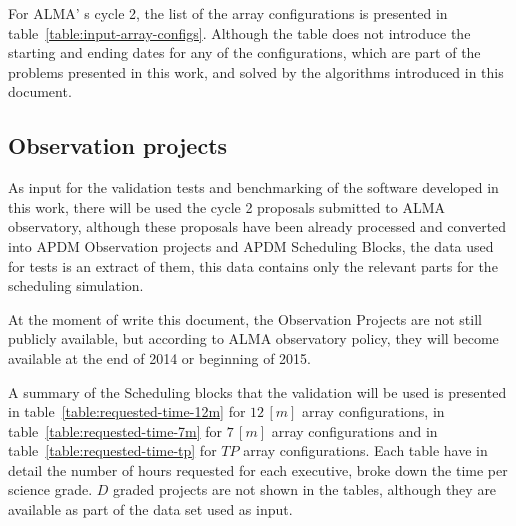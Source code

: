 For ALMA' s cycle 2, the list of the array configurations is presented in table~\ref{table:input-array-configs}. Although the table does not introduce the starting and ending dates for any of the configurations, which are part of the problems presented in this work, and solved by the algorithms introduced in this document.


\subsection{Observation projects}
As input for the validation tests and benchmarking of the software developed in this work, there will be used the cycle 2 proposals submitted to ALMA observatory, although these proposals have been already processed and converted into APDM Observation projects and APDM Scheduling Blocks, the data used for tests is an extract of them, this data contains only the relevant parts for the scheduling simulation.

At the moment of write this document, the Observation Projects are not still publicly available, but according to ALMA observatory policy, they will become available at the end of 2014 or beginning of 2015. 

A summary of the Scheduling blocks that the validation will be used is presented in table~\ref{table:requested-time-12m} for $12\,[m]$ array configurations, in table~\ref{table:requested-time-7m} for $7\,[m]$ array configurations and in table~\ref{table:requested-time-tp} for $TP$  array configurations. Each table have in detail the number of hours requested for each executive, broke down the time per science grade. $D$ graded projects are not shown in the tables, although they are available as part of the data set used as input.

